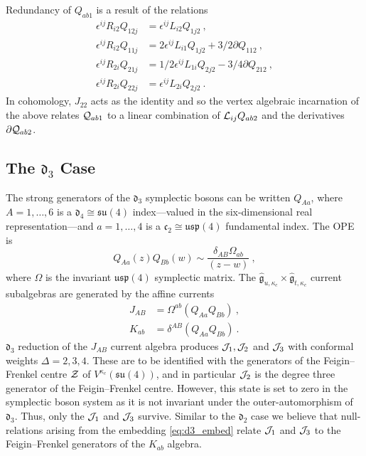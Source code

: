 \documentclass[a4paper]{article}
\def\JJ{{\cal J}}
\def\LL{{\cal L}}
\def\QQ{{\cal Q}}
\def\ZZ{{\cal Z}}
\def\suf{\mathfrak{su}}
\def\ccf{\mathfrak{c}}
\def\df{\mathfrak{d}}
\def\gf{\mathfrak{g}}
\begin{document}
Redundancy of $Q_{ab1}$ is a result of the relations
\begin{equation}
	\begin{split}
	\epsilon^{ij}R_{i2} Q_{12j} &=  \epsilon^{ij}L_{i2}Q_{1j2}~,\\
	\epsilon^{ij}R_{i2} Q_{11j} &=  2\epsilon^{ij}L_{i1}Q_{1j2}+3/2 \partial Q_{112}~,\\
	\epsilon^{ij}R_{2i} Q_{21j} &=  1/2\epsilon^{ij}L_{1i}Q_{2j2}-3/4 \partial Q_{212}~,\\
	\epsilon^{ij}R_{2i} Q_{22j} &=  \epsilon^{ij}L_{2i}Q_{2j2}~.
	\end{split}
\end{equation}
In cohomology, $J_{22}$ acts as the identity and so the vertex algebraic incarnation of the above relates $\QQ_{ab1}$ to a linear combination of $\LL_{ij}Q_{ab2}$ and the derivatives $\partial \QQ_{ab2}$.

\subsection{\label{subsec:d3_DS}The \texorpdfstring{$\df_3$}{d3} Case}

The strong generators of the $\df_3$ symplectic bosons can be written $Q_{Aa}$, where $A=1,\dots,6$ is a $\df_4\cong\suf(4)$ index---valued in the six-dimensional real representation---and $a=1,\dots,4$ is a $\ccf_2\cong\mathfrak{usp}(4)$ fundamental index. The OPE is
\begin{equation}
	Q_{Aa}(z)Q_{Bb}(w) \sim \frac{ \delta_{AB}\Omega_{ab}}{(z-w)}~,
\end{equation}
where $\Omega$ is the invariant $\mathfrak{usp}(4)$ symplectic matrix. The $\hat{\gf}_{u,\kappa_c}\times\hat{\gf}_{t,\kappa_c}$ current subalgebras are generated by the affine currents
\begin{equation}\label{eq:d3_embed}
\begin{split}
	J_{AB} &= \Omega^{ab}(Q_{Aa}Q_{Bb})~,\\
	K_{ab} &= \delta^{AB}(Q_{Aa}Q_{Bb})~.
\end{split}
\end{equation}
$\df_3$ reduction of the $J_{AB}$ current algebra produces $\JJ_1,\JJ_2$ and $\JJ_3$ with conformal weights $\Delta=2,3,4$. These are to be identified with the generators of the Feigin--Frenkel centre $\ZZ$ of $V^{\kappa_c}(\suf(4))$, and in particular $\JJ_2$ is the degree three generator of the Feigin--Frenkel centre. However, this state is set to zero in the symplectic boson system as it is not invariant under the outer-automorphism of $\df_3$. Thus, only the $\JJ_1$ and $\JJ_3$ survive. Similar to the $\df_2$ case we believe that null-relations arising from the embedding \eqref{eq:d3_embed} relate $\JJ_1$ and $\JJ_3$ to the Feigin--Frenkel generators of the $K_{ab}$ algebra.
\end{document}
